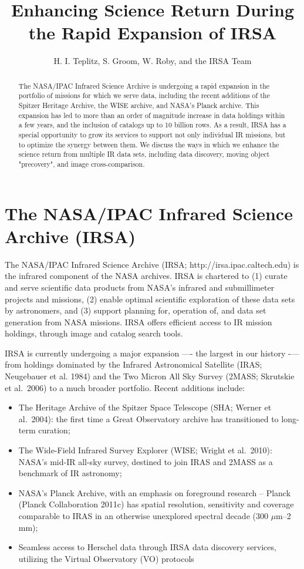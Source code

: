 \documentclass[11pt,twoside]{article}
\begin{document}
\title{Enhancing Science Return During the Rapid Expansion of IRSA}
\author{H. I. Teplitz, S. Groom, W. Roby, and the IRSA Team
}

\begin{abstract}
  The NASA/IPAC Infrared Science Archive is undergoing a rapid
  expansion in the portfolio of missions for which we serve data,
  including the recent additions of the Spitzer Heritage Archive, the
  WISE archive, and NASA's Planck archive. This expansion has led to
  more than an order of magnitude increase in data holdings within a
  few years, and the inclusion of catalogs up to 10 billion rows. As a
  result, IRSA has a special opportunity to grow its services to
  support not only individual IR missions, but to optimize the synergy
  between them. We discuss the ways in which we enhance the science
  return from multiple IR data sets, including data discovery, moving
  object "precovery", and image cross-comparison.
\end{abstract}

\section{The NASA/IPAC Infrared Science Archive (IRSA)}

The NASA/IPAC Infrared Science Archive (IRSA;
http://irsa.ipac.caltech.edu) is the infrared component of the NASA
archives. IRSA is chartered to (1) curate and serve scientific data
products from NASA’s infrared and submillimeter projects and missions,
(2) enable optimal scientific exploration of these data sets by
astronomers, and (3) support planning for, operation of, and data set
generation from NASA missions. IRSA offers efficient access to IR
mission holdings, through image and catalog search tools. 

IRSA is currently undergoing a major expansion —- the largest in our
history -— from holdings dominated by the Infrared Astronomical Satellite
(IRAS; Neugebauer et al. 1984) and the Two Micron All Sky Survey
(2MASS; Skrutskie et al.\ 2006) to a much broader
portfolio. Recent additions include:

\begin{itemize}

\item The Heritage Archive of the Spitzer Space Telescope (SHA; Werner
  et al.\ 2004): the first time a
  Great Observatory archive has transitioned to long-term curation; 
\item The Wide-Field Infrared Survey Explorer (WISE; Wright et al.\ 2010): NASA’s mid-IR all-sky survey, destined to
  join IRAS and 2MASS as a benchmark of IR astronomy; 
\item NASA's Planck Archive, with an emphasis on foreground research
  -- Planck (Planck Collaboration 2011c) has spatial resolution, sensitivity and coverage
  comparable to IRAS in an otherwise unexplored spectral decade (300
  $\mu$m–2 mm); 
\item Seamless access to Herschel data through IRSA data discovery
  services, utilizing the Virtual Observatory (VO) protocols

\end{itemize}
\end{document}

